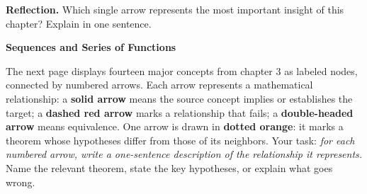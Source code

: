 \documentclass[worksheet]{workbook}
\begin{document}
\normalsize

\noindent\textbf{Reflection.} Which single arrow represents the most important insight of this chapter?  Explain in one sentence.

\vfill













\newpage



\newpage
\begin{center}
{\Large\bfseries\color{maroon} Sequences and Series of Functions}
\end{center}

\medskip

\noindent The next page displays fourteen major concepts from chapter 3 as labeled nodes, connected by numbered arrows.  Each arrow represents a mathematical relationship: a \textbf{solid arrow} means the source concept implies or establishes the target; a \textbf{dashed red arrow} marks a relationship that \alert{fails}; a \textbf{double-headed arrow} means equivalence.  One arrow is drawn in \textbf{\textcolor{orange!80!black}{dotted orange}}: it marks a theorem whose hypotheses differ from those of its neighbors.  Your task: \textit{for each numbered arrow, write a one-sentence description of the relationship it represents.}  Name the relevant theorem, state the key hypotheses, or explain what goes wrong.

\bigskip


\medskip
\small
\end{document}
